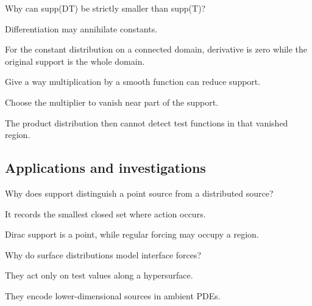 \begin{exercise}\label{exr:iii17-expand-11}
Why can supp(DT) be strictly smaller than supp(T)?
\end{exercise}
\begin{hint}
Differentiation may annihilate constants.
\end{hint}
\begin{solution}
For the constant distribution on a connected domain, derivative is zero while the original support is the whole domain.
\end{solution}

\begin{exercise}\label{exr:iii17-expand-12}
Give a way multiplication by a smooth function can reduce support.
\end{exercise}
\begin{hint}
Choose the multiplier to vanish near part of the support.
\end{hint}
\begin{solution}
The product distribution then cannot detect test functions in that vanished region.
\end{solution}

\subsection*{Applications and investigations}

\begin{exercise}\label{exr:iii17-expand-13}
Why does support distinguish a point source from a distributed source?
\end{exercise}
\begin{hint}
It records the smallest closed set where action occurs.
\end{hint}
\begin{solution}
Dirac support is a point, while regular forcing may occupy a region.
\end{solution}

\begin{exercise}\label{exr:iii17-expand-14}
Why do surface distributions model interface forces?
\end{exercise}
\begin{hint}
They act only on test values along a hypersurface.
\end{hint}
\begin{solution}
They encode lower-dimensional sources in ambient PDEs.
\end{solution}

